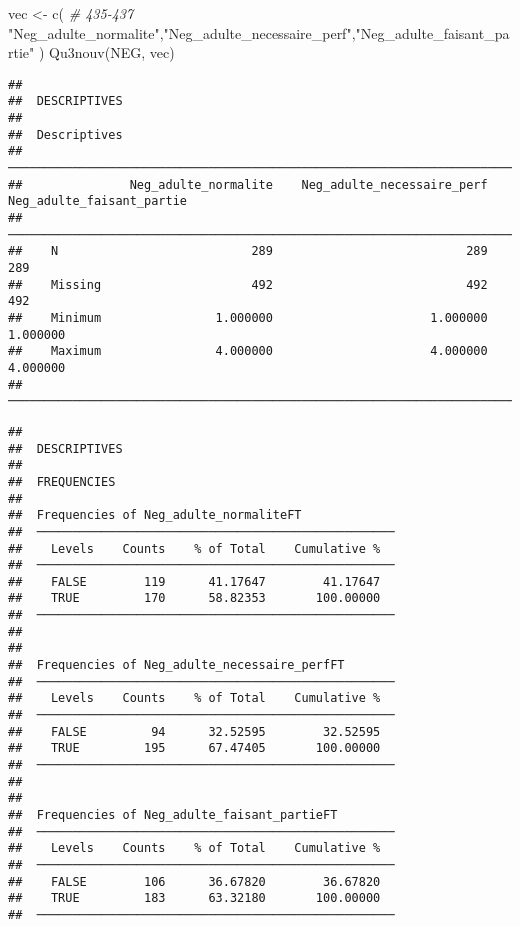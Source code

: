 \documentclass[
]{article}
\newenvironment{Shaded}{\begin{snugshade}}{\end{snugshade}}
\newcommand{\CommentTok}[1]{\textcolor[rgb]{0.56,0.35,0.01}{\textit{#1}}}
\newcommand{\FunctionTok}[1]{\textcolor[rgb]{0.00,0.00,0.00}{#1}}
\newcommand{\NormalTok}[1]{#1}
\newcommand{\OtherTok}[1]{\textcolor[rgb]{0.56,0.35,0.01}{#1}}
\newcommand{\StringTok}[1]{\textcolor[rgb]{0.31,0.60,0.02}{#1}}
\begin{document}
\begin{Shaded}
\begin{Highlighting}[]
\NormalTok{vec }\OtherTok{\textless{}{-}} \FunctionTok{c}\NormalTok{(  }\CommentTok{\# 435{-}437}
  \StringTok{"Neg\_adulte\_normalite"}\NormalTok{,}\StringTok{"Neg\_adulte\_necessaire\_perf"}\NormalTok{,}\StringTok{"Neg\_adulte\_faisant\_partie"}\NormalTok{ )}
\FunctionTok{Qu3nouv}\NormalTok{(NEG, vec)}
\end{Highlighting}
\end{Shaded}

\begin{verbatim}
## 
##  DESCRIPTIVES
## 
##  Descriptives                                                                                   
##  ────────────────────────────────────────────────────────────────────────────────────────────── 
##               Neg_adulte_normalite    Neg_adulte_necessaire_perf    Neg_adulte_faisant_partie   
##  ────────────────────────────────────────────────────────────────────────────────────────────── 
##    N                           289                           289                          289   
##    Missing                     492                           492                          492   
##    Minimum                1.000000                      1.000000                     1.000000   
##    Maximum                4.000000                      4.000000                     4.000000   
##  ──────────────────────────────────────────────────────────────────────────────────────────────
\end{verbatim}

\begin{verbatim}
## 
##  DESCRIPTIVES
## 
##  FREQUENCIES
## 
##  Frequencies of Neg_adulte_normaliteFT              
##  ────────────────────────────────────────────────── 
##    Levels    Counts    % of Total    Cumulative %   
##  ────────────────────────────────────────────────── 
##    FALSE        119      41.17647        41.17647   
##    TRUE         170      58.82353       100.00000   
##  ────────────────────────────────────────────────── 
## 
## 
##  Frequencies of Neg_adulte_necessaire_perfFT        
##  ────────────────────────────────────────────────── 
##    Levels    Counts    % of Total    Cumulative %   
##  ────────────────────────────────────────────────── 
##    FALSE         94      32.52595        32.52595   
##    TRUE         195      67.47405       100.00000   
##  ────────────────────────────────────────────────── 
## 
## 
##  Frequencies of Neg_adulte_faisant_partieFT         
##  ────────────────────────────────────────────────── 
##    Levels    Counts    % of Total    Cumulative %   
##  ────────────────────────────────────────────────── 
##    FALSE        106      36.67820        36.67820   
##    TRUE         183      63.32180       100.00000   
##  ──────────────────────────────────────────────────
\end{verbatim}
\end{document}
